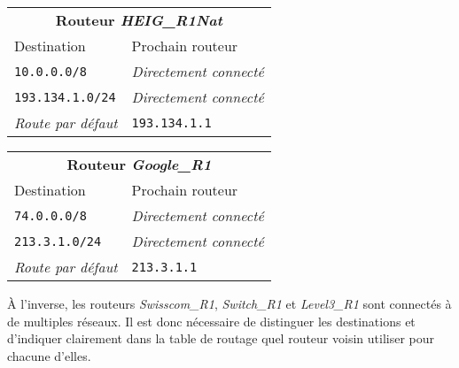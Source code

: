 \documentclass[11pt,a4paper]{article}
\begin{document}
\begin{tabular}{|ll|}
	\hline
	\multicolumn{2}{|c|}{\textbf{Routeur \textit{HEIG\_R1Nat}}} \\
	Destination & Prochain routeur \\
	\hline
	\texttt{10.0.0.0/8} & \textit{Directement connecté} \\
	\texttt{193.134.1.0/24} & \textit{Directement connecté} \\
	\textit{Route par défaut} & \texttt{193.134.1.1} \\
	\hline
\end{tabular}
\hspace{0.5mm}
\begin{tabular}{|ll|}
	\hline
	\multicolumn{2}{|c|}{\textbf{Routeur \textit{Google\_R1}}} \\
	Destination & Prochain routeur \\
	\hline
	\texttt{74.0.0.0/8} & \textit{Directement connecté} \\
	\texttt{213.3.1.0/24} & \textit{Directement connecté} \\
	\textit{Route par défaut} & \texttt{213.3.1.1} \\
	\hline
\end{tabular}

\vspace{0.5cm}

À l'inverse, les routeurs \textit{Swisscom\_R1}, \textit{Switch\_R1} et \textit{Level3\_R1} sont connectés à de multiples réseaux. Il est donc nécessaire de distinguer les destinations et d'indiquer clairement dans la table de routage quel routeur voisin utiliser pour chacune d'elles.
\end{document}
